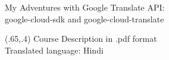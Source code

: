 \documentclass{beamer}
\begin{document}
\begin{frame}{My Adventures with Google Translate API:\\
google-cloud-sdk and google-cloud-translate}


\begin{textblock}{1}(.65,.4)
  \footnotesize  {Course Description in .pdf format \\
Translated language: Hindi}
\end{textblock}

\end{frame}
\end{document}
